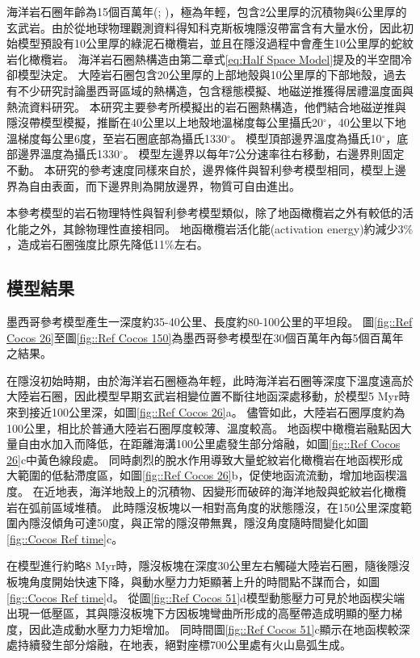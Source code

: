 海洋岩石圈年齡為15個百萬年(\citealp{Manea2011Thermal}; \citealp{muller2019})，極為年輕，包含2公里厚的沉積物與6公里厚的玄武岩。由於從地球物理觀測資料得知科克斯板塊隱沒帶富含有大量水份，因此初始模型預設有10公里厚的綠泥石橄欖岩，並且在隱沒過程中會產生10公里厚的蛇紋岩化橄欖岩。
海洋岩石圈熱構造由第二章式\ref{eq:Half Space Model}提及的半空間冷卻模型決定。
大陸岩石圈包含20公里厚的上部地殼與10公里厚的下部地殼，過去有不少研究討論墨西哥區域的熱構造，包含穩態模擬、地磁逆推獲得居禮溫度面與熱流資料研究。
本研究主要參考\citealp{Manea2011Curie}所模擬出的岩石圈熱構造，他們結合地磁逆推與隱沒帶模型模擬，推斷在40公里以上地殼地溫梯度每公里攝氏20$^{\circ}$，40公里以下地溫梯度每公里6度，至岩石圈底部為攝氏1330$^{\circ}$。
模型頂部邊界溫度為攝氏10$^{\circ}$，底部邊界溫度為攝氏1330$^{\circ}$。
模型左邊界以每年7公分速率往右移動，右邊界則固定不動。
本研究的參考速度同樣來自於\citealp{o2005uncertainties}，邊界條件與智利參考模型相同，模型上邊界為自由表面，而下邊界則為開放邊界，物質可自由進出。

本參考模型的岩石物理特性與智利參考模型類似，除了地函橄欖岩之外有較低的活化能之外，其餘物理性直接相同。
地函橄欖岩活化能(activation energy)約減少3$\%$，造成岩石圈強度比原先降低11$\%$左右。


\subsection{模型結果}\label{墨西哥參考模型結果}
墨西哥參考模型產生一深度約35-40公里、長度約80-100公里的平坦段。
圖\ref{fig::Ref Cocos 26}至圖\ref{fig::Ref Cocos 150}為墨西哥參考模型在30個百萬年內每5個百萬年之結果。

在隱沒初始時期，由於海洋岩石圈極為年輕，此時海洋岩石圈等深度下溫度遠高於大陸岩石圈，因此模型早期玄武岩相變位置不斷往地函深處移動，於模型5 Myr時來到接近100公里深，如圖\ref{fig::Ref Cocos 26}a。
儘管如此，大陸岩石圈厚度約為100公里，相比於普通大陸岩石圈厚度較薄、溫度較高。
地函楔中橄欖岩融點因大量自由水加入而降低，在距離海溝100公里處發生部分熔融，如圖\ref{fig::Ref Cocos 26}c中黃色線段處。
同時劇烈的脫水作用導致大量蛇紋岩化橄欖岩在地函楔形成大範圍的低黏滯度區，如圖\ref{fig::Ref Cocos 26}b，促使地函流流動，增加地函楔溫度。
在近地表，海洋地殼上的沉積物、因變形而破碎的海洋地殼與蛇紋岩化橄欖岩在弧前區域堆積。
此時隱沒板塊以一相對高角度的狀態隱沒，在150公里深度範圍內隱沒傾角可達50度，與正常的隱沒帶無異，隱沒角度隨時間變化如圖\ref{fig::Cocos Ref time}c。

在模型進行約略8 Myr時，隱沒板塊在深度30公里左右觸碰大陸岩石圈，隨後隱沒板塊角度開始快速下降，與動水壓力力矩顯著上升的時間點不謀而合，如圖\ref{fig::Cocos Ref time}d。
從圖\ref{fig::Ref Cocos 51}d模型動態壓力可見於地函楔尖端出現一低壓區，其與隱沒板塊下方因板塊彎曲所形成的高壓帶造成明顯的壓力梯度，因此造成動水壓力力矩增加。
同時間圖\ref{fig::Ref Cocos 51}c顯示在地函楔較深處持續發生部分熔融，在地表，絕對座標700公里處有火山島弧生成。

